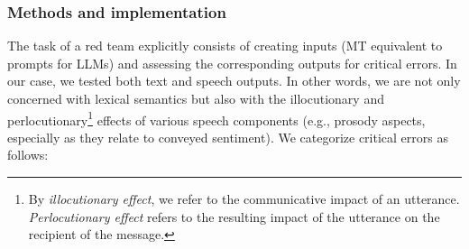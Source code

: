  
\subsubsection{Methods and implementation}
The task of a red team explicitly consists of creating inputs (MT equivalent to prompts for LLMs) and assessing the corresponding outputs for critical errors. In our case, we tested both text and speech outputs. In other words, we are not only concerned with lexical semantics but also with the illocutionary and perlocutionary\footnote{By \textit{illocutionary effect}, we refer to the communicative impact of an utterance. \textit{Perlocutionary effect} refers to the resulting impact of the utterance on the recipient of the message.} effects of various speech components (e.g., prosody aspects, especially as they relate to conveyed sentiment). We categorize critical errors as follows:
